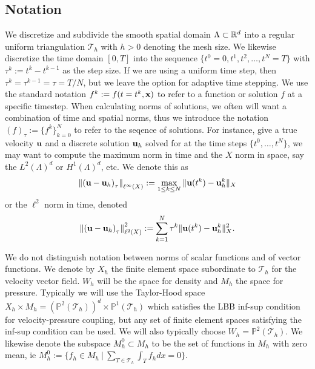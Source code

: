 \documentclass[letterpaper]{erdc}
\begin{document}
\subsection{Notation}
We discretize and subdivide the smooth spatial domain $\Lambda\subset \mathbb{R}^d$ into a regular uniform triangulation $\mathcal{T}_h$ with $h>0$ denoting the mesh size.  We likewise discretize the time domain $[0,T]$ into the sequence $\{ t^0=0, t^1, t^2, \dots, t^N = T\}$  with $\tau^k:= t^k-t^{k-1}$ as the step size.  If we are using a uniform time step, then $\tau^k = \tau^{k-1} = \tau = T/N$, but we leave the option for adaptive time stepping.  We use the standard notation $f^{k} := f(t=t^k,\textbf{x})$ to refer to a function or solution $f$ at a specific timestep.  When calculating norms of solutions, we often will want a combination of time and spatial norms,  thus we introduce the notation $\left( f \right)_{\tau}:= \{ f^k \}_{k=0}^{N}$ to refer to the seqence of solutions.  For instance, give a true velocity $\textbf{u}$ and a discrete solution $\textbf{u}_h$ solved for at the time steps $\{t^0,\dots, t^{N}\}$, we may want to compute the maximum norm in time and the $X$ norm in space, say the $L^2(\Lambda)^d$ or $H^1(\Lambda)^d$, etc.  We denote this as
\begin{equation}
  \left\| \left( \textbf{u} - \textbf{u}_h \right)_{\tau} \right\|_{\ell^{\infty}(X)} := \max_{1\leq k \leq N} \| \textbf{u}(t^{k}) - \textbf{u}_h^{k}\|_{X}
\end{equation}
or the $\ell^2$ norm in time, denoted
\begin{equation}
  \left\| \left( \textbf{u} - \textbf{u}_h \right)_{\tau} \right\|^2_{\ell^{2}(X)} :=  \sum_{k=1}^{N} \tau^{k}\| \textbf{u}(t^{k}) - \textbf{u}_h^{k}\|^2_{X}.
\end{equation}

We do not distinguish notation between norms of scalar functions and of vector functions.  We denote by $X_h$ the finite element space subordinate to $\mathcal{T}_h$ for the velocity vector field.  $W_h$ will be the space for density and $M_h$ the space for pressure.  Typically we will use the Taylor-Hood space $X_h \times M_h = \left(\mathbb{P}^2\left(\mathcal{T}_h\right)\right)^d\times \mathbb{P}^1\left(\mathcal{T}_h\right)$ which satisfies the LBB inf-sup condition for velocity-pressure coupling, but any set of finite element spaces satisfying the inf-sup condition can be used.  We will also typically choose $W_h = \mathbb{P}^2\left(\mathcal{T}_h\right)$.  We likewise denote the subspace $M_h^0\subset M_h$ to be the set of functions in $M_h$ with zero mean, ie $M_h^0 := \{ f_h\in M_h \:|\: \sum_{T\in\mathcal{T}_h}\int_{T}f_h dx = 0\}$.
\end{document}
